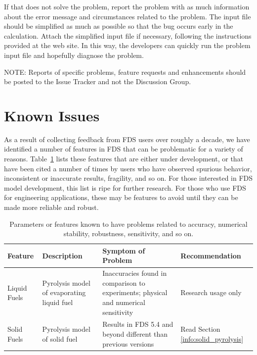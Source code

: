 \documentclass[11pt]{book}
\begin{document}
If that does not solve the problem, report the problem with as much information about the error message and
circumstances related to the problem. The input file should be simplified
as much as possible so that the bug occurs early in the calculation.
Attach the simplified input file if necessary, following the instructions provided at the web site.
In this way, the developers can quickly run the problem input file and hopefully diagnose the problem.

\begin{warning}
\noindent
NOTE: Reports of specific problems, feature requests and enhancements
should be posted to the Issue Tracker and not the Discussion Group.
\end{warning}


\section{Known Issues}
\label{info:Known_Issues}

As a result of collecting feedback from FDS users over roughly a decade, we have identified a number of features in FDS that can be problematic for a
variety of reasons.
Table~\ref{tbl:Known_Issues} lists these features that are either under development, or that have been cited a number of
times by users who have observed spurious behavior, inconsistent or inaccurate results, fragility, and so on. For those interested in
FDS model development, this list is ripe for further research. For those who use FDS for engineering applications, these may be features to avoid until
they can be made more reliable and robust.

\begin{table}
\caption[FDS features with known issues or problems.]{Parameters or features known to have problems related to accuracy, numerical stability, robustness,
sensitivity, and so on.}
\label{tbl:Known_Issues}
\begin{tabular}{|p{}|p{2.1in}|p{2.1in}|p{2.1in}|}
\hline
Feature & Description & Symptom of Problem & Recommendation \\
\hline \hline
Liquid Fuels    & Pyrolysis model of evaporating liquid fuel  & Inaccuracies found in comparison to experiments; physical and numerical sensitivity  & Research usage only    \\ \hline
Solid Fuels     & Pyrolysis model of solid fuel  & Results in FDS 5.4 and beyond different than previous versions  & Read Section \ref{info:solid_pyrolysis}   \\ \hline
\end{tabular}
\end{table}
\end{document}
